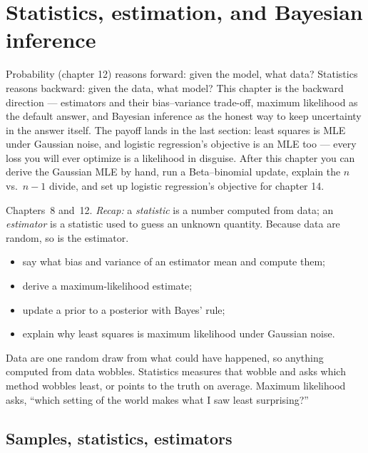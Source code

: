 \chapter{Statistics, estimation, and Bayesian inference}\label{ch:stats}

Probability (chapter 12) reasons forward: given the model, what data?
Statistics reasons backward: given the data, what model? This chapter is
the backward direction --- estimators and their bias--variance trade-off,
maximum likelihood as the default answer, and Bayesian inference as the
honest way to keep uncertainty in the answer itself. The payoff lands in
the last section: least squares is MLE under Gaussian noise, and logistic
regression's objective is an MLE too --- every loss you will ever
optimize is a likelihood in disguise. After this chapter you can derive
the Gaussian MLE by hand, run a Beta--binomial update, explain the
$n$ vs.\ $n-1$ divide, and set up logistic regression's objective for
chapter 14.

\begin{rulebox}
Chapters~8 and~12. \emph{Recap:} a \emph{statistic} is a number computed from data; an \emph{estimator} is a statistic used to guess an unknown quantity. Because data are random, so is the estimator.
\end{rulebox}
\begin{wins}
\begin{itemize}
\item say what bias and variance of an estimator mean and compute them;
\item derive a maximum-likelihood estimate;
\item update a prior to a posterior with Bayes' rule;
\item explain why least squares is maximum likelihood under Gaussian noise.
\end{itemize}
\end{wins}
\begin{principle}
Data are one random draw from what could have happened, so anything computed from data wobbles. Statistics measures that wobble and asks which method wobbles least, or points to the truth on average. Maximum likelihood asks, ``which setting of the world makes what I saw least surprising?''
\end{principle}

\section{Samples, statistics, estimators}\label{sec:stats-samples}

